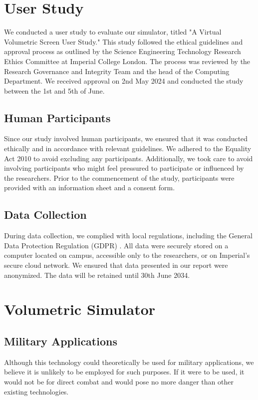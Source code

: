 \section{User Study}
We conducted a user study to evaluate our simulator, titled "A Virtual Volumetric Screen User Study." This study followed the ethical guidelines and approval process as outlined by the Science Engineering Technology Research Ethics Committee at Imperial College London. The process was reviewed by the Research Governance and Integrity Team and the head of the Computing Department. We received approval on 2nd May 2024 and conducted the study between the 1st and 5th of June.

\subsection{Human Participants}
Since our study involved human participants, we ensured that it was conducted ethically and in accordance with relevant guidelines. We adhered to the Equality Act 2010 \cite{participation_equality_nodate} to avoid excluding any participants. Additionally, we took care to avoid involving participants who might feel pressured to participate or influenced by the researchers. Prior to the commencement of the study, participants were provided with an information sheet and a consent form.

\subsection{Data Collection}
During data collection, we complied with local regulations, including the General Data Protection Regulation (GDPR) \cite{EuropeanParliament2016a}. All data were securely stored on a computer located on campus, accessible only to the researchers, or on Imperial's secure cloud network. We ensured that data presented in our report were anonymized. The data will be retained until 30th June 2034.

\section{Volumetric Simulator}
\subsection{Military Applications}
Although this technology could theoretically be used for military applications, we believe it is unlikely to be employed for such purposes. If it were to be used, it would not be for direct combat and would pose no more danger than other existing technologies.

